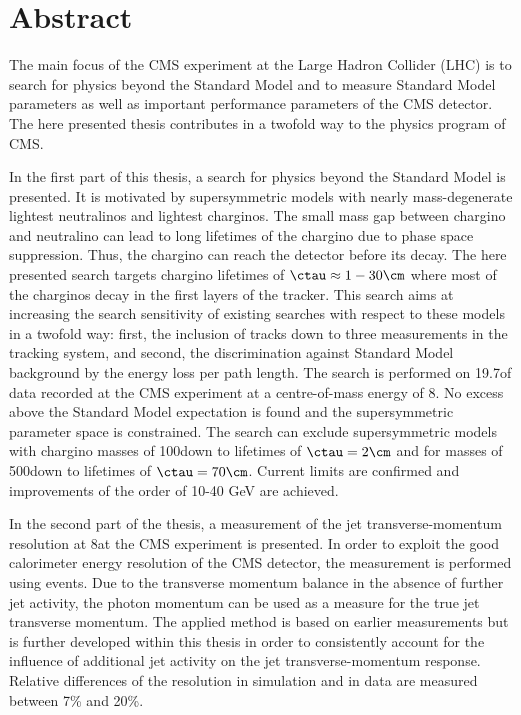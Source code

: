\chapter*{Abstract}

The main focus of the CMS experiment at the Large Hadron Collider (LHC) is to search for physics beyond the Standard Model and to measure Standard Model parameters as well as important performance parameters of the CMS detector.
The here presented thesis contributes in a twofold way to the physics program of CMS.

In the first part of this thesis, a search for physics beyond the Standard Model is presented.
It is motivated by supersymmetric models with nearly mass-degenerate lightest neutralinos and lightest charginos.
The small mass gap between chargino and neutralino can lead to long lifetimes of the chargino due to phase space suppression.
Thus, the chargino can reach the detector before its decay.
The here presented search targets chargino lifetimes of $\ctau \approx 1 - 30\cm $ where most of the charginos decay in the first layers of the tracker. 
This search aims at increasing the search sensitivity of existing searches with respect to these models in a twofold way: first, the inclusion of tracks down to three measurements in the tracking system, and second, the discrimination against Standard Model background by the energy loss per path length.
The search is performed on 19.7\fbinv of data recorded at the CMS experiment at a centre-of-mass energy of 8\tev.
No excess above the Standard Model expectation is found and the supersymmetric parameter space is constrained.
The search can exclude supersymmetric models with chargino masses of 100\gev down to lifetimes of $\ctau=2\cm$ and for masses of 500\gev down to lifetimes of $\ctau=70\cm$.
Current limits are confirmed and improvements of the order of 10-40 GeV are achieved.

In the second part of the thesis, a measurement of the jet transverse-momentum resolution at 8\tev at the CMS experiment is presented.
In order to exploit the good calorimeter energy resolution of the CMS detector, the measurement is performed using \GAMJET events.
Due to the transverse momentum balance in the absence of further jet activity, the photon momentum can be used as a measure for the true jet transverse momentum. 
The applied method is based on earlier measurements but is further developed within this thesis in order to consistently account for the influence of additional jet activity on the jet transverse-momentum response.
Relative differences of the resolution in simulation and in data are measured between 7\% and 20\%. 

\cleardoublepage
